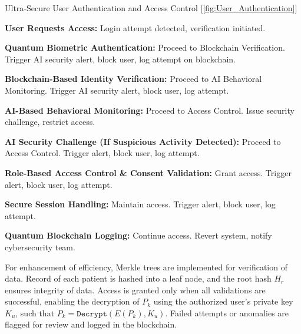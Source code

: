 \documentclass[pdflatex,sn-mathphys-num]{sn-jnl}
\theoremstyle{thmstyleone}%
\theoremstyle{thmstyletwo}%
\theoremstyle{thmstylethree}%
\begin{document}
\begin{algorithm}[h!]
\caption{Ultra-Secure User Authentication and Access Control [\ref{fig:User_Authentication}]}
\begin{algorithmic}[1]
\STATE 	\textbf{User Requests Access:} Login attempt detected, verification initiated.

\STATE 	\textbf{Quantum Biometric Authentication:} 
 Proceed to Blockchain Verification.
\ELSE Trigger AI security alert, block user, log attempt on blockchain. \ENDIF

\STATE 	\textbf{Blockchain-Based Identity Verification:} 
 Proceed to AI Behavioral Monitoring.
\ELSE Trigger AI security alert, block user, log attempt. \ENDIF

\STATE 	\textbf{AI-Based Behavioral Monitoring:} 
 Proceed to Access Control.
\ELSE Issue security challenge, restrict access. \ENDIF

\STATE 	\textbf{AI Security Challenge (If Suspicious Activity Detected):} 
 Proceed to Access Control.
\ELSE Trigger alert, block user, log attempt. \ENDIF

\STATE 	\textbf{Role-Based Access Control \& Consent Validation:} 
 Grant access.
\ELSE Trigger alert, block user, log attempt. \ENDIF

\STATE 	\textbf{Secure Session Handling:} 
 Maintain access.
\ELSE Trigger alert, block user, log attempt. \ENDIF

\STATE 	\textbf{Quantum Blockchain Logging:} 
 Continue access.
\ELSE Revert system, notify cybersecurity team. \ENDIF
\end{algorithmic}
\end{algorithm}



For enhancement of efficiency, Merkle trees are implemented for verification of data. Record of each patient is hashed into a leaf node, and the root hash \( H_r \) ensures integrity of data. Access is granted only when all validations are successful, enabling the decryption of \( P_k \) using the authorized user’s private key \( K_u \), such that \( P_k = \texttt{Decrypt}(E(P_k), K_u) \). Failed attempts or anomalies are flagged for review and logged in the blockchain\cite{bib8}.




\end{document}

